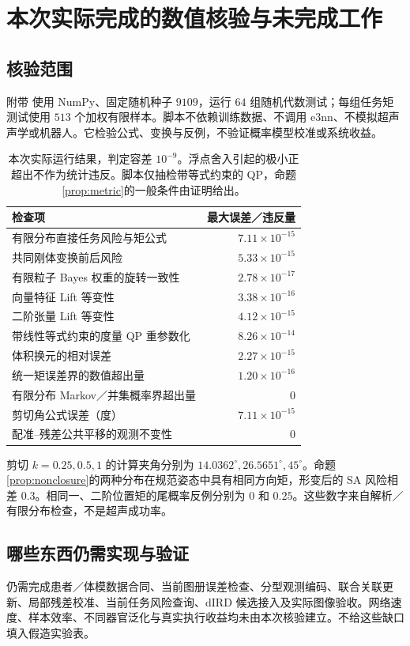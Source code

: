 \documentclass[UTF8,fontset=fandol,11pt,a4paper]{ctexart}
\theoremstyle{plain}
\theoremstyle{definition}
\theoremstyle{remark}
\numberwithin{equation}{section}
\newcommand{\code}[1]{\texttt{\detokenize{#1}}}
\begin{document}
\section{本次实际完成的数值核验与未完成工作}
\label{sec:verification}
\subsection{核验范围}
附带 \code{verify_v91.py} 使用 NumPy、固定随机种子 $9109$，运行 $64$ 组随机代数测试；每组任务矩测试使用 $513$ 个加权有限样本。脚本不依赖训练数据、不调用 e3nn、不模拟超声声学或机器人。它检验公式、变换与反例，不验证概率模型校准或系统收益。

\begin{table}[htbp]\centering\small
\begin{tabularx}{\linewidth}{Y r}\toprule
检查项 & 最大误差／违反量\\\midrule
有限分布直接任务风险与矩公式 & $7.11\times10^{-15}$\\
共同刚体变换前后风险 & $5.33\times10^{-15}$\\
有限粒子 Bayes 权重的旋转一致性 & $2.78\times10^{-17}$\\
向量特征 Lift 等变性 & $3.38\times10^{-16}$\\
二阶张量 Lift 等变性 & $4.12\times10^{-15}$\\
带线性等式约束的度量 QP 重参数化 & $8.26\times10^{-14}$\\
体积换元的相对误差 & $2.27\times10^{-15}$\\
统一矩误差界的数值超出量 & $1.20\times10^{-16}$\\
有限分布 Markov／并集概率界超出量 & $0$\\
剪切角公式误差（度） & $7.11\times10^{-15}$\\
配准--残差公共平移的观测不变性 & $0$\\\bottomrule
\end{tabularx}
\caption{本次实际运行结果，判定容差 $10^{-9}$。浮点舍入引起的极小正超出不作为统计违反。脚本仅抽检带等式约束的 QP，命题\ref{prop:metric}的一般条件由证明给出。}
\end{table}

剪切 $k=0.25,0.5,1$ 的计算夹角分别为 $14.0362^\circ,26.5651^\circ,45^\circ$。命题\ref{prop:nonclosure}的两种分布在规范姿态中具有相同方向矩，形变后的 SA 风险相差 $0.3$。相同一、二阶位置矩的尾概率反例分别为 $0$ 和 $0.25$。这些数字来自解析／有限分布检查，不是超声成功率。

\subsection{哪些东西仍需实现与验证}
仍需完成患者／体模数据合同、当前图册误差检查、分型观测编码、联合关联更新、局部残差校准、当前任务风险查询、dIRD 候选接入及实际图像验收。网络速度、样本效率、不同器官泛化与真实执行收益均未由本次核验建立。不给这些缺口填入假造实验表。
\end{document}
